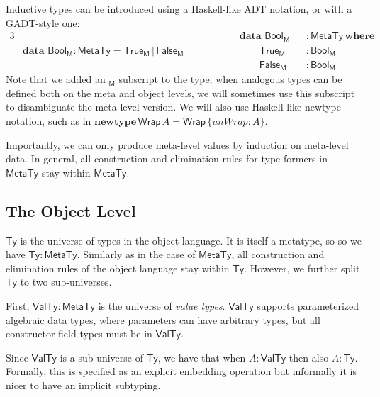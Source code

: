 \documentclass[acmsmall,screen,review,anonymous]{acmart}
\newcommand{\mit}[1]{\mathit{#1}}
\newcommand{\msf}[1]{\mathsf{#1}}
\newcommand{\mbf}[1]{\mathbf{#1}}
\newcommand{\bs}[1]{\boldsymbol{#1}}
\newcommand{\ind}{\hspace{1em}}
\newcommand{\data}{\mbf{data}\,}
\newcommand{\where}{\mbf{where}}
\newcommand{\M}{\msf{M}}
\newcommand{\Bool}{\msf{Bool}}
\newcommand{\MTy}{\msf{MetaTy}}
\newcommand{\VTy}{\msf{ValTy}}
\newcommand{\Ty}{\msf{Ty}}
\newcommand{\True}{\msf{True}}
\newcommand{\False}{\msf{False}}
\theoremstyle{remark}
\newcommand{\newtype}{\mbf{newtype}\,}
\begin{document}
Inductive types can be introduced using a Haskell-like ADT notation, or with a GADT-style one:
\begin{alignat*}{3}
  &                                           &&\hspace{4em}\data\,\Bool_\M &&: \MTy\,\where\\
  & \data\,\Bool_\M : \MTy = \True_\M\,|\,\False_\M &&\hspace{4em}\ind\ind \True_\M &&: \Bool_\M\\
  &                                           &&\hspace{4em}\ind\ind \False_\M &&: \Bool_\M
\end{alignat*}
Note that we added an $_\M$ subscript to the type; when analogous types can be
defined both on the meta and object levels, we will sometimes use this subscript
to disambiguate the meta-level version. We will also use Haskell-like newtype
notation, such as in $\newtype \msf{Wrap}\,A = \msf{Wrap}\,\{\mit{unWrap} : A
\}$.

Importantly, we can only produce meta-level values by induction on meta-level
data. In general, all construction and elimination rules for type formers in
$\MTy$ stay within $\MTy$.

\subsection{The Object Level}\label{sec:the-object-level}

$\bs{\Ty}$ is the universe of types in the object language. It is itself a
metatype, so so we have $\Ty : \MTy$. Similarly as in the case of $\MTy$, all
construction and elimination rules of the object language stay within $\Ty$.
However, we further split $\Ty$ to two sub-universes.

First, $\bs{\VTy} : \MTy$ is the universe of \emph{value types}. $\VTy$ supports
parameterized algebraic data types, where parameters can have arbitrary types,
but all constructor field types must be in $\VTy$.

Since $\VTy$ is a sub-universe of $\Ty$, we have that when $A : \VTy$ then also
$A : \Ty$. Formally, this is specified as an explicit embedding operation but
informally it is nicer to have an implicit subtyping.
\end{document}

